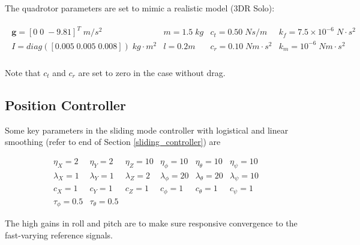 \documentclass[journal,11pt,onecolumn,draftclsnofoot,]{IEEEtran}
\begin{document}
The quadrotor parameters are set to mimic a realistic model (3DR Solo):

\begin{equation*}
\label{model_param1}
\begin{split}
\begin{matrix}
\boldsymbol{g} = \left[0 \; 0\; -9.81 \right]^T \; m/s^2 & 
m = 1.5 \; kg & 
c_t = 0.50 \; Ns/m &
k_f = 7.5 \times 10^{-6} \; N \cdot s^2 \\
I = diag([0.005 \; 0.005 \; 0.008]) \; kg \cdot m^2 &
l = 0.2 m & 
c_r = 0.10 \; Nm \cdot s^2 & 
k_m = 10^{-6} \; Nm \cdot s^2 \\
\end{matrix}
\end{split}
\end{equation*}

Note that $c_t$ and $c_r$ are set to zero in the case without drag.

\subsection{Position Controller}

Some key parameters in the sliding mode controller with logistical and linear smoothing (refer to end of Section \ref{sliding_controller}) are

\begin{equation*}
\label{param_SM_combo}
\begin{matrix}
\eta_{X} = 2 & \eta_{Y} = 2 & \eta_{Z} = 10 &
\eta_{\phi} = 10 & \eta_{\theta} = 10 & \eta_{\psi} = 10 \\
\lambda_X = 1 & \lambda_Y = 1 & \lambda_Z = 2 &
\lambda_\phi = 20 & \lambda_\theta = 20 & \lambda_\psi = 10 \\
c_X = 1 & c_Y = 1 & c_Z = 1 &
c_\phi = 1 & c_\theta = 1 & c_\psi = 1 \\
\tau_\phi = 0.5 & \tau_\theta = 0.5
\end{matrix}
\end{equation*}

The high gains in roll and pitch are to make sure responsive convergence to the fast-varying reference signals.

\end{document}
